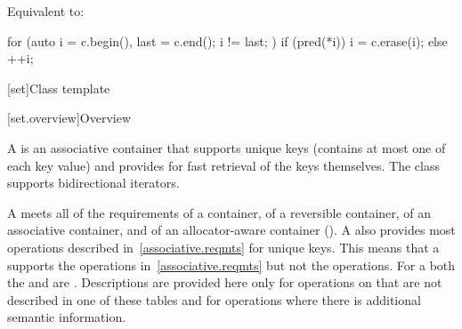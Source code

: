 \begin{itemdescr}
\pnum
\effects
Equivalent to:
\begin{codeblock}
for (auto i = c.begin(), last = c.end(); i != last; ) {
  if (pred(*i)) {
    i = c.erase(i);
  } else {
    ++i;
  }
}
\end{codeblock}
\end{itemdescr}

[set]{Class template }

[set.overview]{Overview}

\pnum
{}%
A
is an associative container that supports unique keys (contains at most one of each key value) and
provides for fast retrieval of the keys themselves.
The
 class
supports bidirectional iterators.

\pnum
A  meets all of the requirements of a container, of a reversible
container, of an associative
container, and of an allocator-aware container
().
A
also provides most operations described in~\ref{associative.reqmts}
for unique keys.
This means that a
supports the
operations in~\ref{associative.reqmts}
but not the
operations.
For a
both the
and
are
.
Descriptions are provided here only for operations on
that are not described in one of these tables
and for operations where there is additional semantic information.

